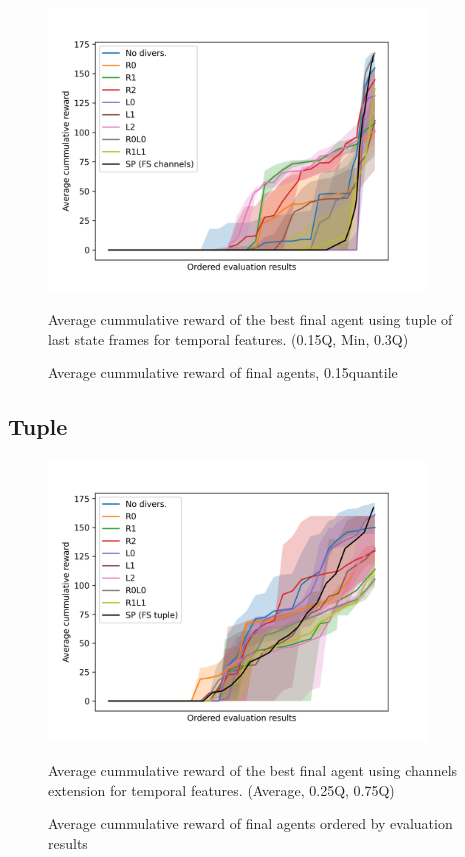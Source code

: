 \begin{figure}[!ht]
    \centering
    \includegraphics*[width=10cm]{../img/FSChannelsOrderedQ15.png}

    \caption{Average cummulative reward of final agents, 0.15quantile}
    \label{FSChannelsOrderedQ15}
    \medskip
    \small 
    Average cummulative reward of the best final agent using tuple of last state frames for temporal features.
    (0.15Q, Min, 0.3Q)

\end{figure}

\newpage

\subsection{Tuple}

\begin{figure}[!ht]
    \centering
    \includegraphics*[width=10cm]{../img/FSTupleOrderedAvg.png}

    \caption{Average cummulative reward of final agents ordered by evaluation results}
    \label{FSTupleOrderedAvg}
    \medskip
    \small 
    Average cummulative reward of the best final agent using channels extension for temporal features.    
    (Average, 0.25Q, 0.75Q)

\end{figure}

